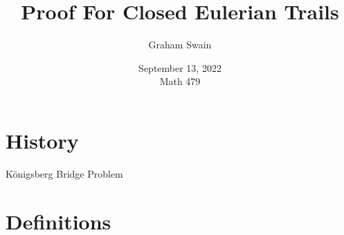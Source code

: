 \documentclass{beamer}
\title{Proof For Closed Eulerian Trails}
\author[Graham Swain]{Graham Swain}
\date{September 13, 2022 \\ Math 479}
\begin{document}
    
\frame{\titlepage}

\section{History}

\begin{frame}{K\"{o}nigsberg Bridge Problem}
	\begin{figure}
		\centering
	\end{figure}
\end{frame}

\section{Definitions}
\end{document}
